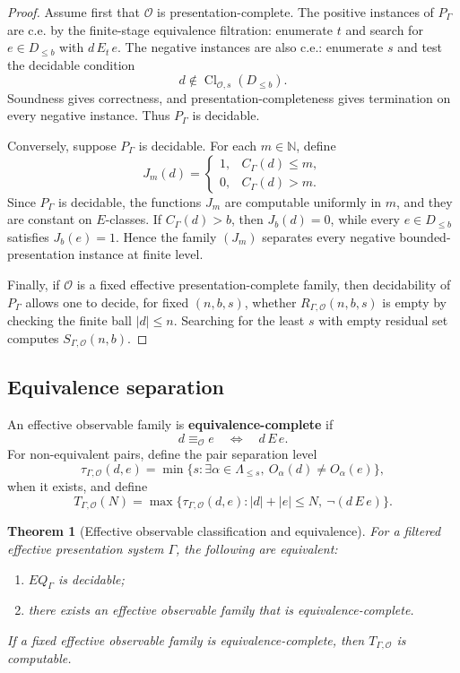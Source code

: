 \documentclass[11pt]{article}
\newtheorem{theorem}{Theorem}[section]
\theoremstyle{definition}
\theoremstyle{remark}
\begin{document}
\begin{proof}
Assume first that \(\mathcal O\) is presentation-complete.  The positive instances of \(P_\Gamma\) are c.e. by the finite-stage equivalence filtration: enumerate \(t\) and search for \(e\in D_{\leq b}\) with \(d\,E_t\,e\).  The negative instances are also c.e.: enumerate \(s\) and test the decidable condition
\[
d\notin\operatorname{Cl}_{\mathcal O,s}(D_{\leq b}).
\]
Soundness gives correctness, and presentation-completeness gives termination on every negative instance.  Thus \(P_\Gamma\) is decidable.

Conversely, suppose \(P_\Gamma\) is decidable.  For each \(m\in\mathbb N\), define
\[
J_m(d)=
\begin{cases}
1,& C_\Gamma(d)\leq m,\\
0,& C_\Gamma(d)>m.
\end{cases}
\]
Since \(P_\Gamma\) is decidable, the functions \(J_m\) are computable uniformly in \(m\), and they are constant on \(E\)-classes.  If \(C_\Gamma(d)>b\), then \(J_b(d)=0\), while every \(e\in D_{\leq b}\) satisfies \(J_b(e)=1\).  Hence the family \((J_m)\) separates every negative bounded-presentation instance at finite level.

Finally, if \(\mathcal O\) is a fixed effective presentation-complete family, then decidability of \(P_\Gamma\) allows one to decide, for fixed \((n,b,s)\), whether \(R_{\Gamma,\mathcal O}(n,b,s)\) is empty by checking the finite ball \(|d|\leq n\).  Searching for the least \(s\) with empty residual set computes \(S_{\Gamma,\mathcal O}(n,b)\).
\end{proof}

\subsection{Equivalence separation}

An effective observable family is \textbf{equivalence-complete} if
\[
d\equiv_{\mathcal O}e
\quad\Longleftrightarrow\quad
d\,E\,e.
\]
For non-equivalent pairs, define the pair separation level
\[
\tau_{\Gamma,\mathcal O}(d,e)
=
\min\{s:\exists\alpha\in\Lambda_{\leq s},\ O_\alpha(d)\neq O_\alpha(e)\},
\]
when it exists, and define
\[
T_{\Gamma,\mathcal O}(N)
=
\max\{\tau_{\Gamma,\mathcal O}(d,e): |d|+|e|\leq N,\ \neg(d\,E\,e)\}.
\]

\begin{theorem}[Effective observable classification and equivalence]
For a filtered effective presentation system \(\Gamma\), the following are equivalent:
\begin{enumerate}[label=(\roman*)]
\item \(EQ_\Gamma\) is decidable;
\item there exists an effective observable family that is equivalence-complete.
\end{enumerate}
If a fixed effective observable family is equivalence-complete, then \(T_{\Gamma,\mathcal O}\) is computable.
\end{theorem}
\end{document}
